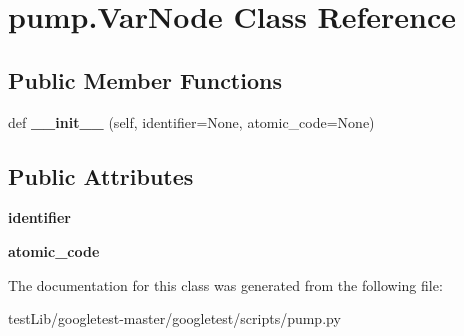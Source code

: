 \hypertarget{classpump_1_1VarNode}{}\section{pump.\+Var\+Node Class Reference}
\label{classpump_1_1VarNode}
\subsection*{Public Member Functions}
\begin{DoxyCompactItemize}
\item 
\mbox{\label{classpump_1_1VarNode_adf79bf21b1db5367792a4ac91f94a756}} 
def {\bfseries \+\_\+\+\_\+init\+\_\+\+\_\+} (self, identifier=None, atomic\+\_\+code=None)
\end{DoxyCompactItemize}
\subsection*{Public Attributes}
\begin{DoxyCompactItemize}
\item 
\mbox{\label{classpump_1_1VarNode_aa2b634e2443646c3754f2d193efa4dc7}} 
{\bfseries identifier}
\item 
\mbox{\label{classpump_1_1VarNode_ad6bef6a8577b994fbe9ccddf3c82d2fc}} 
{\bfseries atomic\+\_\+code}
\end{DoxyCompactItemize}


The documentation for this class was generated from the following file\+:\begin{DoxyCompactItemize}
\item 
test\+Lib/googletest-\/master/googletest/scripts/pump.\+py\end{DoxyCompactItemize}
